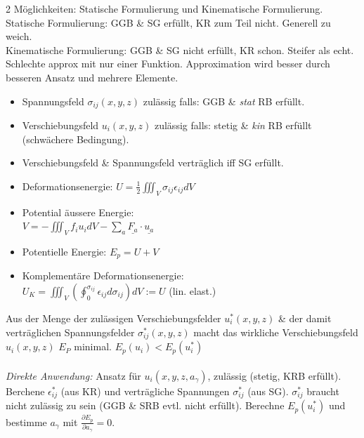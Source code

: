 \documentclass[a4paper,10pt]{article}
\begin{document}
\begin{multicols*}{3}
        2 Möglichkeiten: Statische Formulierung und Kinematische Formulierung.\\
        Statische Formulierung: GGB \& SG erfüllt, KR zum Teil nicht. Generell zu weich.\\
        Kinematische Formulierung: GGB \& SG nicht erfüllt, KR schon. Steifer als echt. Schlechte approx mit nur einer Funktion. Approximation wird besser durch besseren Ansatz und mehrere Elemente.
        
            \vspace{-4mm}
            \begin{itemize}
                \item Spannungsfeld $\sigma_{ij}(x,y,z)$ zulässig falls: GGB \& \textit{stat} RB erfüllt.
                \item Verschiebungsfeld $u_i(x,y,z)$ zulässig falls: stetig \& \textit{kin} RB erfüllt (schwächere Bedingung).
                \item Verschiebungsfeld \& Spannungsfeld verträglich iff SG erfüllt.
                \item Deformationsenergie: $\displaystyle U=\frac{1}{2}\iiint_V \sigma_{ij}\epsilon_{ij}dV$
                \item Potential äussere Energie:\\
                $\displaystyle V=-\iiint_V f_iu_idV-\sum_{a}\underline{F_a}\cdot\underline{u_a}$ 
                \item Potentielle Energie: $E_p=U+V$
                \item Komplementäre Deformationsenergie:\\ $U_K=\iiint_V(\oint_0^{\sigma_{ij}}\epsilon_{ij}d\sigma_{ij})dV := U$  (lin. elast.)
            \end{itemize}
            
            Aus der Menge der zulässigen Verschiebungsfelder $u_i^*(x,y,z)$ \& der damit verträglichen Spannungsfelder $\sigma_{ij}^*(x,y,z)$ macht das wirkliche Verschiebungsfeld $u_i(x,y,z)$ $E_P$ minimal. $E_p(u_i) < E_p(u_i^*)$\\\\
            \textit{Direkte Anwendung:} Ansatz für $u_i(x,y,z,a_\gamma)$, zulässig (stetig, KRB erfüllt). Berchene $\epsilon_{ij}^*$ (aus KR) und verträgliche Spannungen $\sigma_{ij}^*$ (aus SG). $\sigma_{ij}^*$ braucht nicht zulässig zu sein (GGB \& SRB evtl. nicht erfüllt). Berechne $E_p(u_i^*)$ und bestimme $a_\gamma$ mit $\frac{\partial E_p}{\partial a_\gamma}=0$.
            

\end{multicols*}
\end{document}
